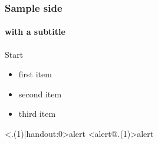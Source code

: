 \documentclass[handout]{beamer}
\begin{document}
\begin{frame}
\frametitle{Sample side}
\framesubtitle{with a subtitle}

Start
\begin{itemize}[<+(1)-| alert@+(1)>]
\item  first item 
\vspace{1cm}
\item second item 
\vspace{1cm}
\item  third item
\end{itemize}
\pause
\alert<.(1)|handout:0>{alert}
\pause
\action<alert@.(1)>{alert}
\pause

\end{frame}
\end{document}
